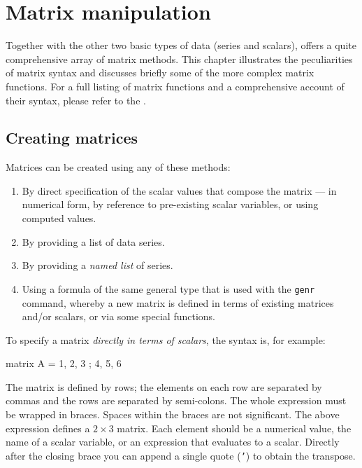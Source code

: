 \chapter{Matrix manipulation}
\label{chap:matrices}

Together with the other two basic types of data (series and scalars),
 offers a quite comprehensive array of matrix methods. This
chapter illustrates the peculiarities of matrix syntax and discusses
briefly some of the more complex matrix functions. For a full listing
of matrix functions and a comprehensive account of their syntax,
please refer to the \GCR.

\section{Creating matrices}
\label{sec:matrix-create}

Matrices can be created using any of these methods:

\begin{enumerate}
\item By direct specification of the scalar values that compose the
  matrix --- in numerical form, by reference to pre-existing
  scalar variables, or using computed values.
\item By providing a list of data series.
\item By providing a \textit{named list} of series.
\item Using a formula of the same general type that is used
  with the \texttt{genr} command, whereby a new matrix is defined
  in terms of existing matrices and/or scalars, or via some
  special functions.
\end{enumerate}

To specify a matrix \textit{directly in terms of scalars}, the syntax
is, for example:

\begin{code}
matrix A = { 1, 2, 3 ; 4, 5, 6 }
\end{code}

The matrix is defined by rows; the elements on each row are separated
by commas and the rows are separated by semi-colons.  The whole
expression must be wrapped in braces.  Spaces within the braces are
not significant.  The above expression defines a $2\times3$ matrix.
Each element should be a numerical value, the name of a scalar
variable, or an expression that evaluates to a scalar.  Directly after
the closing brace you can append a single quote (\texttt{'}) to obtain
the transpose.


